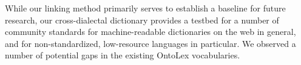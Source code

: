 

While our linking method primarily serves to establish a baseline for future research, our cross-dialectal dictionary provides a testbed for a number of community standards for machine-readable dictionaries on the web in general, and for non-standardized, low-resource languages in particular.
We observed a number of potential gaps in the existing OntoLex vocabularies. 


